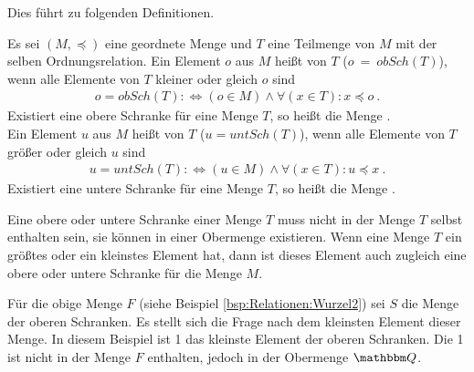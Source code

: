 \begin{Unit}
Dies führt zu folgenden Definitionen.

\begin{Definition}
  Es sei $(M,\preceq)$ eine geordnete Menge und $T$ eine Teilmenge von $M$ 
  mit   der selben Ordnungsrelation. Ein Element $o$ aus $M$ heißt 
   von $T$ ($o\ =\ obSch(T)$), wenn alle Elemente von 
  $T$ kleiner oder gleich $o$ sind
  \begin{align}
    o = obSch(T) :\Leftrightarrow  (o \in M) \land \forall (x \in T):
      x \preceq o \ .
  \end{align}
  Existiert eine obere Schranke für eine Menge $T$, so heißt die Menge 
  . \\ 
  Ein Element $u$ aus $M$ heißt  von $T$ ($u = untSch(T)$), wenn alle Elemente von $T$ größer oder 
  gleich $u$ sind
  \begin{align}
    u = untSch(T) :\Leftrightarrow (u \in M) \land \forall (x \in T): 
    u \preceq x \ .
  \end{align}
  Existiert eine untere Schranke für eine Menge $T$, so heißt die Menge 
  .
\end{Definition}

Eine obere oder untere Schranke einer Menge $T$ muss nicht in der Menge $T$ 
selbst enthalten sein, sie können in einer Obermenge existieren. Wenn eine 
Menge $T$ ein größtes oder ein kleinstes Element hat, dann ist dieses Element 
auch zugleich eine obere oder untere Schranke für die Menge $M$.
\end{Unit}

\begin{Unit}[Beispiel]
  Für die obige Menge $F$ (siehe Beispiel \ref{bsp:Relationen:Wurzel2}) 
  sei $S$ die Menge der oberen Schranken. Es stellt sich die Frage nach 
  dem kleinsten Element dieser Menge. In diesem Beispiel ist 1 das kleinste 
  Element der oberen Schranken. Die 1 ist nicht in der Menge $F$ enthalten, 
  jedoch in der Obermenge $\QQ$.
\end{Unit}

